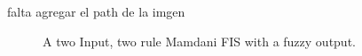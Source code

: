 falta agregar el path de la imgen

\begin{figure}
\captionsetup{justification=centering,margin=2cm}
\centering
\setlength\fboxsep{0pt}
\setlength\fboxrule{0.7pt}
\caption{A two Input, two rule Mamdani FIS with a fuzzy output.}
\label{fig:fuzzyOut}
\end{figure}
